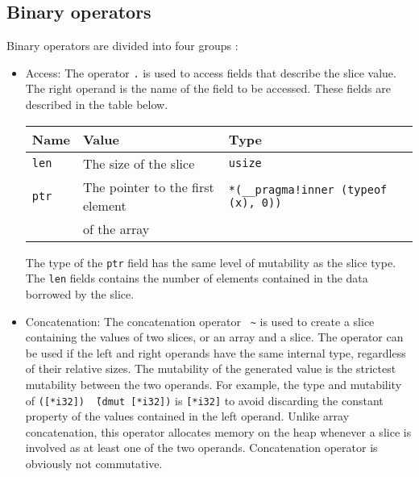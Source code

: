 \subsection{Binary operators}

Binary operators are divided into four groups :
\begin{itemize}
\item Access: The operator \texttt{.} is used to access fields that describe the slice value. The right operand is the name of the field to be accessed. These fields are described in the table below.

  \begin{center}\begin{adjustbox}{max width=\linewidth}
      \begin{tabular}{|l|ll|}
        \hline
        Name & Value & Type\\
        \hline
        \hline
        \texttt{len} & The size of the slice & \texttt{usize} \\
        \texttt{ptr} & The pointer to the first element  & \texttt{*(\_\_pragma!inner (typeof (x), 0))} \\
        & of the array & \\
        \hline
      \end{tabular}
  \end{adjustbox}\end{center}

  The type of the \texttt{ptr} field has the same level of mutability as the
  slice type. The \texttt{len} fields contains the number of elements contained
  in the data borrowed by the slice.

\item Concatenation: The concatenation operator ~\texttt{\~} is used to create a
  slice containing the values of two slices, or an array and a slice. The
  operator can be used if the left and right operands have the same internal
  type, regardless of their relative sizes. The mutability of the generated
  value is the strictest mutability between the two operands. For example, the
  type and mutability of \texttt{([*i32]) \~\ (dmut [*i32])} is \texttt{[*i32]}
  to avoid discarding the constant property of the values contained in the left
  operand. Unlike array concatenation, this operator allocates memory on the
  heap whenever a slice is involved as at least one of the two operands.
  Concatenation operator is obviously not commutative.


\end{itemize}
